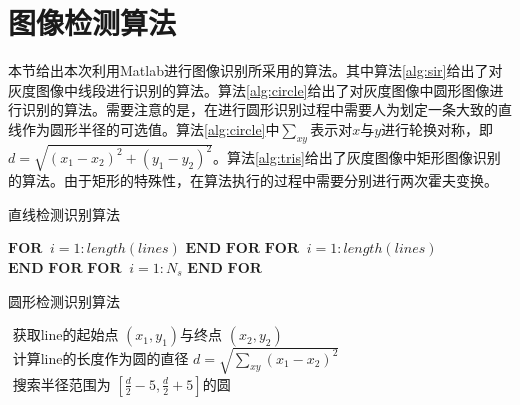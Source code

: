 \documentclass[conference]{IEEEtran}
\begin{document}
\section{图像检测算法}
本节给出本次利用Matlab进行图像识别所采用的算法。其中算法\ref{alg:sir}给出了对灰度图像中线段进行识别的算法。算法\ref{alg:circle}给出了对灰度图像中圆形图像进行识别的算法。需要注意的是，在进行圆形识别过程中需要人为划定一条大致的直线作为圆形半径的可选值。算法\ref{alg:circle}中$\sum_{xy}$表示对$x$与$y$进行轮换对称，即$d = \sqrt{(x_1 - x_2)^2 + (y_1 - y_2)^2}$。算法\ref{alg:tris}给出了灰度图像中矩形图像识别的算法。由于矩形的特殊性，在算法执行的过程中需要分别进行两次霍夫变换。
\begin{algorithm}[H]
    \caption{直线检测识别算法}\label{alg:sir}
    \begin{algorithmic}
    \STATE 
    \STATE {}
	\STATE {}
	\STATE {}
	\STATE {}
    \STATE \hspace{0.5cm}$ \textbf{FOR} \;\;i = 1: length(lines)$
    \STATE \hspace{1cm}
    \STATE \hspace{0.5cm}$ \textbf{END FOR}$
	\STATE \hspace{0.5cm}$ \textbf{FOR} \;\;i = 1: length(lines)$
    \STATE \hspace{1cm}
    \STATE \hspace{0.5cm}$ \textbf{END FOR}$
    \STATE \hspace{0.5cm}$ \textbf{FOR} \;\;i = 1: N_s$
    \STATE \hspace{1cm} 
	\STATE \hspace{1cm} 
	\STATE \hspace{1cm} 
    \STATE \hspace{0.5cm}$ \textbf{END FOR}$
    \end{algorithmic}
\end{algorithm}

\begin{algorithm}[H]
    \caption{圆形检测识别算法}\label{alg:circle}
    \begin{algorithmic}
    \STATE 
	\STATE {}
	\STATE {}
	\STATE $\text{ 获取line的起始点 }(x_1, y_1)\text{与终点 }(x_2, y_2)$
	\STATE $\text{ 计算line的长度作为圆的直径 } d = \sqrt{\sum_{xy}(x_1 - x_2 )^2}$
	\STATE $\text{ 搜索半径范围为 } [\frac{d}{2} - 5, \frac{d}{2} + 5] \text{的圆}$
	\STATE {}
    \end{algorithmic}
\end{algorithm}
\end{document}
